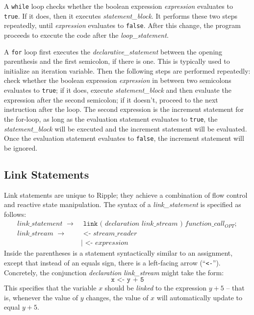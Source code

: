 \documentclass{article}
\newcommand{\code}{\texttt}
\begin{document}
A \code{while} loop checks whether the boolean expression \emph{expression} evaluates to \code{true}. If it does, then it executes \emph{statement\_block}. It performs these two steps repeatedly, until \emph{expression} evaluates to \code{false}. After this change, the program proceeds to execute the code after the \emph{loop\_statement}.

A \code{for} loop first executes the \emph{declarative\_statement} between the opening parenthesis and the first semicolon, if there is one. This is typically used to initialize an iteration variable. Then the following steps are performed repeatedly: check whether the boolean expression \emph{expression} in between two semicolons evaluates to \code{true}; if it does, execute \emph{statement\_block} and then evaluate the expression after the second semicolon; if it doesn't, proceed to the next instruction after the loop. The second expression is the increment statement for the for-loop, as long as the evaluation statement evaluates to \code{true}, the \emph{statement\_block} will be executed and the increment statement will be evaluated. Once the evaluation statement evaluates to \code{false}, the increment statement will be ignored.

\subsection{Link Statements}
Link statements are unique to Ripple; they achieve a combination of flow control and reactive state manipulation. The syntax of a \emph{link\_statement} is specified as follows: 
\begin{align*}
link\_statement\,\,\rightarrow&\,\,\code{link}\,\,\code{(}\,\,declaration\,\,link\_stream\,\,\code{)}\,\,function\_call_{OPT};\\
link\_stream\,\,\rightarrow&  \,\,\code{<-}\,\,stream\_reader\\
                           &| \,\,\code{<-}\,\,expression
\end{align*}
Inside the parentheses is a statement syntactically similar to an assignment, except that instead of an equals sign, there is a left-facing arrow (``\code{<-}''). Concretely, the conjunction \emph{declaration\,\,link\_stream} might take the form:
\[ \code{x}\,\,\code{<-}\,\,\code{y}\,\,\code{+}\,\,\code{5} \]
This specifies that the variable $x$ should be \emph{linked} to the expression $y + 5$ -- that is, whenever the value of $y$ changes, the value of $x$ will automatically update to equal $y + 5$.
\end{document}
